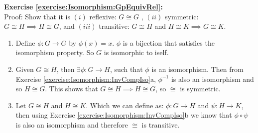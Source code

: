 \noindent\textbf{Exercise \ref{exercise:Isomorphism:GpEquivRel}:}
\\
Proof: Show that it is $(i)$ reflexive: $G \cong G$ , $(ii)$ symmetric: $G \cong H \implies H \cong G$, and $(iii)$ transitive: $G \cong H$ and $H \cong K \implies G \cong K$. 
\begin{enumerate}[($i$)]
\item
Define $\phi: G \rightarrow G$ by $\phi(x) = x$.  $\phi$ is a bijection that satisfies the isomorphism property.  So $G$ is isomorphic to iself.

\item
Given $G \cong H$, then $\exists \phi: G\rightarrow H$, such that $\phi$ is an isomorphism. Then from Exercise \ref{exercise:Isomorphism:InvCompIso}a, $\phi^{-1}$ is also an isomorphism and so $H \cong G$. This shows that $G \cong H \implies H \cong G$, so $\cong$ is symmetric.

\item
Let $G \cong H$ and $H \cong K$. Which we can define as: $\phi: G \rightarrow H$ and $\psi: H \rightarrow K$, then using Exercise \ref{exercise:Isomorphism:InvCompIso}b we know that $\phi \circ \psi$ is also an isomorphism and therefore $\cong$ is transitive.
\end{enumerate}

